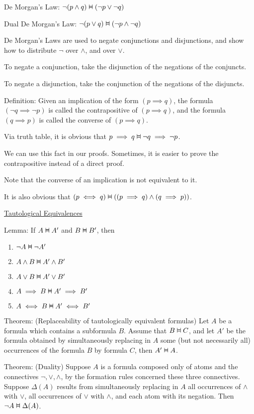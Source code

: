 \documentclass{article}
\newcommand{\vDashv}{%
  \mathrel{%
    \text{%
      \ooalign{$\vDash$\cr\reflectbox{$\vDash$}\cr}%
    }%
  }%
}
\begin{document}
De Morgan's Law: $\neg(p \wedge q) \vDashv (\neg p \vee \neg q)$

Dual De Morgan's Law: $\neg (p \vee q) \vDashv (\neg p \wedge \neg q)$

De Morgan's Laws are used to negate conjunctions and disjunctions, and show how to distribute $\neg$ over $\wedge$, and over $\vee$. 

To negate a conjunction, take the disjunction of the negations of the conjuncts. 

To negate a disjunction, take the conjunction of the negations of the disjuncts. 

Definition: Given an implication of the form $(p \implies q)$, the formula $(\neg q \implies \neg p)$ is called the contrapositive of $(p \implies q)$, and the formula $(q \implies p)$ is called the converse of $(p \implies q)$. 

Via truth table, it is obvious that $p \implies q \vDashv \neg q \implies \neg p$.

We can use this fact in our proofs. Sometimes, it is easier to prove the contrapositive instead of a direct proof. 

Note that the converse of an implication is not equivalent to it. 

It is also obvious that $(p \iff q) \vDashv ((p \implies q) \wedge (q \implies p))$.


\underline{Tautological Equivalences}

Lemma: If $A \vDashv A'$ and $B \vDashv B'$, then
\begin{enumerate}
    \item $\neg A \vDashv \neg A'$ 
    \item $A \wedge B \vDashv A' \wedge B'$ 
    \item $A \vee B \vDashv A' \vee B'$
    \item $A \implies B \vDashv A' \implies B'$
    \item $A \iff B \vDashv A' \iff B'$
\end{enumerate}

Theorem: (Replaceability of tautologically equivalent formulas) Let $A$ be a formula which contains a subformula $B$. Assume that $B \vDashv C$, and let $A'$ be the formula obtained by simultaneously replacing in $A$ some (but not necessarily all) occurrences of the formula $B$ by formula $C$, then $A' \vDashv A$. 

Theorem: (Duality) Suppose $A$ is a formula composed only of atoms and the connectives $\neg, \vee, \wedge$, by the formation rules concerned these three connectives. Suppose $\Delta(A)$ results from simultaneously replacing in $A$ all occurrences of $\wedge$ with $\vee$, all occurrences of $\vee$ with $\wedge$, and each atom with its negation. Then $\neg A \vDashv \Delta(A)$. 
\end{document}
